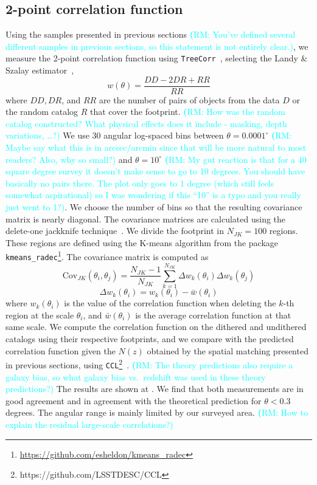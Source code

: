 \documentclass[twocolumn]{aastex62}
\newcommand{\rachel}[1]{{\textcolor{cyan}{{\textbf (RM: #1)}}}}
\begin{document}
\subsection{2-point correlation function}
Using the samples presented in previous sections \rachel{You've defined several different samples in previous sections, so this statement is not entirely clear.}, we measure the 2-point correlation function using \texttt{TreeCorr}~\citep{2004MNRAS.352..338J}, selecting the Landy \& Szalay estimator~\citep{1993ApJ...412...64L},
\begin{equation}
w(\theta) = \frac{DD - 2 DR + RR}{RR}
\end{equation}
where $DD, DR$, and $RR$ are the number of pairs of objects from the data $D$ or the random catalog $R$ that cover the footprint. \rachel{How was the random catalog constructed?  What physical effects does it include - masking, depth variations, \dots?} We use 30 angular log-spaced bins between $\theta=0.0001^{\circ}$ \rachel{Maybe say what this is in arcsec/arcmin since that will be more natural to most readers?  Also, why so small?} and $\theta=10^{\circ}$ \rachel{My gut reaction is that for a 40 square degree survey it doesn't make sense to go to 10 degrees.  You should have basically no pairs there.  The plot only goes to 1 degree (which still feels somewhat aspirational) so I was wondering if this  ``10'' is a typo and you really just went to 1?}. We choose the number of bins so that the resulting covariance matrix is nearly diagonal. The covariance matrices are calculated using the delete-one jackknife technique~\citep{Shao:1986:DJB,2009MNRAS.396...19N}. We divide the footprint in $N_{JK}=100$ regions. These regions are defined using the K-means algorithm from the package \texttt{kmeans\_radec}\footnote{\url{https://github.com/esheldon/kmeans\_radec}}. The covariance matrix is computed as
\begin{equation}
\mathrm{Cov}_{JK}(\theta_{i},\theta_{j})=\frac{N_{JK}-1}{N_{JK}}\sum_{k=1}^{N_{JK}}\Delta w_{k}(\theta_{i}) \Delta w_{k}(\theta_{j})
\end{equation}
\begin{equation}
\Delta w_{k}(\theta_{i}) = w_{k}(\theta_{i})-\bar{w}(\theta_{i})
\end{equation}
where $w_{k}(\theta_{i})$ is the value of the correlation function when deleting the $k$-th region at the scale $\theta_{i}$, and $\bar{w}(\theta_{i})$ is the average correlation function at that same scale. We compute the correlation function on the dithered and undithered catalogs using their respective footprints, and we compare with the predicted correlation function given the $N(z)$ obtained by the spatial matching presented in previous sections, using \texttt{CCL}\footnote{https://github.com/LSSTDESC/CCL}~\citep{CCL}. \rachel{The theory predictions also require a galaxy bias, so what galaxy bias vs.\ redshift was used in these theory predictions?} The results are shown at . We find that both measurements are in good agreement and in agreement with the theoretical prediction for $\theta < 0.3$ degrees. The angular range is mainly limited by our surveyed area. \rachel{How to explain the residual large-scale correlations?}
\end{document}
